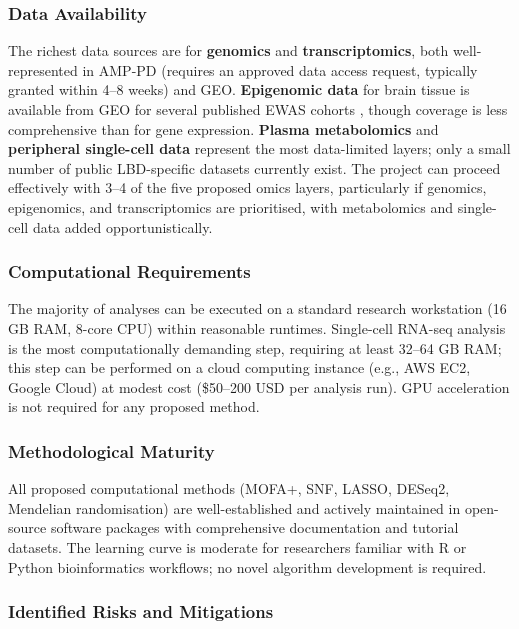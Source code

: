 \subsubsection{Data Availability}
The richest data sources are for \textbf{genomics} and \textbf{transcriptomics}, both well-represented in AMP-PD (requires an approved data access request, typically granted within 4--8 weeks) and GEO. \textbf{Epigenomic data} for brain tissue is available from GEO for several published EWAS cohorts \cite{nabais2024methylation}, though coverage is less comprehensive than for gene expression. \textbf{Plasma metabolomics} and \textbf{peripheral single-cell data} represent the most data-limited layers; only a small number of public LBD-specific datasets currently exist. The project can proceed effectively with 3--4 of the five proposed omics layers, particularly if genomics, epigenomics, and transcriptomics are prioritised, with metabolomics and single-cell data added opportunistically.

\subsubsection{Computational Requirements}
The majority of analyses can be executed on a standard research workstation (16 GB RAM, 8-core CPU) within reasonable runtimes. Single-cell RNA-seq analysis is the most computationally demanding step, requiring at least 32--64 GB RAM; this step can be performed on a cloud computing instance (e.g., AWS EC2, Google Cloud) at modest cost (\$50--200 USD per analysis run). GPU acceleration is not required for any proposed method.

\subsubsection{Methodological Maturity}
All proposed computational methods (MOFA+, SNF, LASSO, DESeq2, Mendelian randomisation) are well-established and actively maintained in open-source software packages with comprehensive documentation and tutorial datasets. The learning curve is moderate for researchers familiar with R or Python bioinformatics workflows; no novel algorithm development is required.

\subsubsection{Identified Risks and Mitigations}

